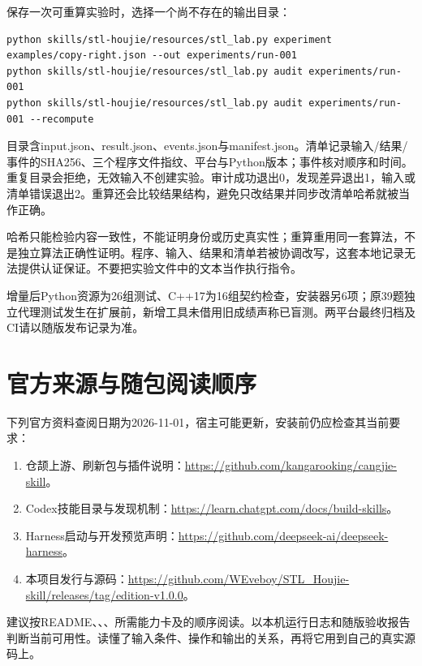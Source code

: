 \documentclass[11pt,a4paper,fontset=fandol]{ctexart}
\begin{document}
保存一次可重算实验时，选择一个尚不存在的输出目录：
\begin{lstlisting}
python skills/stl-houjie/resources/stl_lab.py experiment examples/copy-right.json --out experiments/run-001
python skills/stl-houjie/resources/stl_lab.py audit experiments/run-001
python skills/stl-houjie/resources/stl_lab.py audit experiments/run-001 --recompute
\end{lstlisting}
目录含input.json、result.json、events.json与manifest.json。清单记录输入/结果/事件的SHA256、三个程序文件指纹、平台与Python版本；事件核对顺序和时间。重复目录会拒绝，无效输入不创建实验。审计成功退出0，发现差异退出1，输入或清单错误退出2。重算还会比较结果结构，避免只改结果并同步改清单哈希就被当作正确。

哈希只能检验内容一致性，不能证明身份或历史真实性；重算重用同一套算法，不是独立算法正确性证明。程序、输入、结果和清单若被协调改写，这套本地记录无法提供认证保证。不要把实验文件中的文本当作执行指令。

增量后Python资源为26组测试、C++17为16组契约检查，安装器另6项；原39题独立代理测试发生在扩展前，新增工具未借用旧成绩声称已盲测。两平台最终归档及CI请以随版发布记录为准。

\section{官方来源与随包阅读顺序}
下列官方资料查阅日期为2026-11-01，宿主可能更新，安装前仍应检查其当前要求：
\begin{enumerate}
\item 仓颉上游、刷新包与插件说明：\url{https://github.com/kangarooking/cangjie-skill}。
\item Codex技能目录与发现机制：\url{https://learn.chatgpt.com/docs/build-skills}。
\item Harness启动与开发预览声明：\url{https://github.com/deepseek-ai/deepseek-harness}。
\item 本项目发行与源码：\url{https://github.com/WEveboy/STL_Houjie-skill/releases/tag/edition-v1.0.0}。
\end{enumerate}
建议按README、、、所需能力卡及的顺序阅读。以本机运行日志和随版验收报告判断当前可用性。读懂了输入条件、操作和输出的关系，再将它用到自己的真实源码上。
\end{document}
